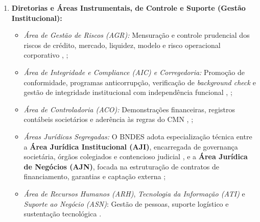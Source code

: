 \begin{enumerate}[label=\textbf{\arabic*.}]
    \item \textbf{Diretorias e Áreas Instrumentais, de Controle e Suporte (Gestão Institucional):}
          \begin{itemize}
              \item \emph{Área de Gestão de Riscos (AGR):} Mensuração e controle prudencial dos riscos de crédito, mercado, liquidez, modelo e risco operacional corporativo \cite[art.~74]{bndes2025estatuto}, \cite[p.~35, 138]{bndes2026oib};
              \item \emph{Área de Integridade e Compliance (AIC) e Corregedoria:} Promoção de conformidade, programas anticorrupção, verificação de \emph{background check} e gestão de integridade institucional com independência funcional \cite[arts.~73,~\S~3º e 74]{bndes2025estatuto}, \cite[p.~11, item II.8; p.~21, 29, 33]{bndes2026oib};
              \item \emph{Área de Controladoria (ACO):} Demonstrações financeiras, registros contábeis societários e aderência às regras do CMN \cite[art.~80]{bndes2025estatuto}, \cite[p.~35, 38]{bndes2026oib};
              \item \emph{Áreas Jurídicas Segregadas:} O BNDES adota especialização técnica entre a \textbf{Área Jurídica Institucional (AJI)}, encarregada de governança societária, órgãos colegiados e contencioso judicial \cite[p.~148, 163]{bndes2026oib}, e a \textbf{Área Jurídica de Negócios (AJN)}, focada na estruturação de contratos de financiamento, garantias e captação externa \cite[p.~171--172]{bndes2026oib};
              \item \emph{Área de Recursos Humanos (ARH)}, \emph{Tecnologia da Informação (ATI)} e \emph{Suporte ao Negócio (ASN)}: Gestão de pessoas, suporte logístico e sustentação tecnológica \cite[p.~11, 73, 133, 147]{bndes2026oib}.
          \end{itemize}


\end{enumerate}
